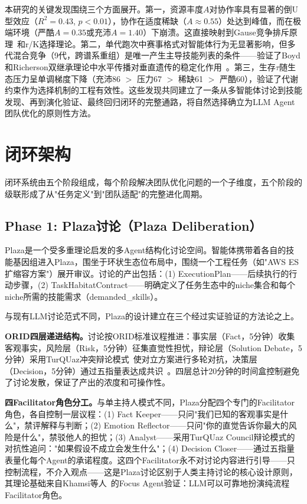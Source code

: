 \documentclass[conference]{IEEEtran}
\begin{document}
本研究的关键发现围绕三个方面展开。第一，资源丰度$A$对协作率具有显著的倒U型效应（$R^2=0.43$, $p<0.01$），协作在适度稀缺（$A\approx0.55$）处达到峰值，而在极端环境（严酷$A=0.35$或充沛$A=1.40$）下崩溃。这直接映射到Gause竞争排斥原理~\cite{gause1934struggle}和r/K选择理论。第二，单代跑次中赛事格式对智能体行为无显著影响，但多代混合竞争（9代，跨谱系重组）是唯一产生主导技能列表的条件——验证了Boyd和Richerson双继承理论中水平传播对垂直遗传的稳定化作用~\cite{boyd1985culture}。第三，生存$\tau$随生态压力呈单调梯度下降（充沛86 $>$ 压力67 $>$ 稀缺61 $>$ 严酷60），验证了代谢约束作为选择机制的工程有效性。这些发现共同建立了一条从多智能体讨论到技能发现、再到演化验证、最终回归闭环的完整通路，将自然选择确立为LLM Agent团队优化的原则性方法。

\section{闭环架构}

闭环系统由五个阶段组成，每个阶段解决团队优化问题的一个子维度，五个阶段的级联形成了从"任务定义"到"团队适配"的完整进化周期。

\subsection{Phase 1: Plaza讨论（Plaza Deliberation）}

Plaza是一个受多重理论启发的多Agent结构化讨论空间。智能体携带着各自的技能基因组进入Plaza，围坐于环状生态位布局中，围绕一个工程任务（如"AWS ES扩缩容方案"）展开审议。讨论的产出包括：(1) ExecutionPlan——后续执行的行动步骤，(2) TaskHabitatContract——明确定义了任务生态中的niche集合和每个niche所需的技能需求（demanded\_skills）。

与现有LLM讨论范式不同，Plaza的设计建立在三个经过实证验证的方法论之上。

\textbf{ORID四层递进结构。}讨论按ORID标准议程推进：事实层（Fact，5分钟）收集客观事实，风险层（Risk，5分钟）征集直觉性担忧，辩论层（Solution Debate，5分钟）采用TurQUaz冲突辩论模式~\cite{gungor2025turquaz}使对立方案进行多轮对抗，决策层（Decision，5分钟）通过五指量表达成共识~\cite{kaner2014facilitator}。四层总计20分钟的时间盒控制避免了讨论发散，保证了产出的浓度和可操作性。

\textbf{四Facilitator角色分工。}与单主持人模式不同，Plaza分配四个专门的Facilitator角色，各自控制一层议程：(1) Fact Keeper——只问"我们已知的客观事实是什么"，禁评解释与判断；(2) Emotion Reflector——只问"你的直觉告诉你最大的风险是什么"，禁驳他人的担忧；(3) Analyst——采用TurQUaz Council辩论模式的对抗性追问："如果假设不成立会发生什么"；(4) Decision Closer——通过五指量表量化每个Agent的承诺程度。这四个Facilitator永不对讨论内容进行引导——只控制流程，不介入观点——这是Plaza讨论区别于人类主持讨论的核心设计原则，其理论基础来自Khamsi等人~\cite{khamsi2024focus}的Focus Agent验证：LLM可以可靠地扮演纯流程Facilitator角色。
\end{document}
